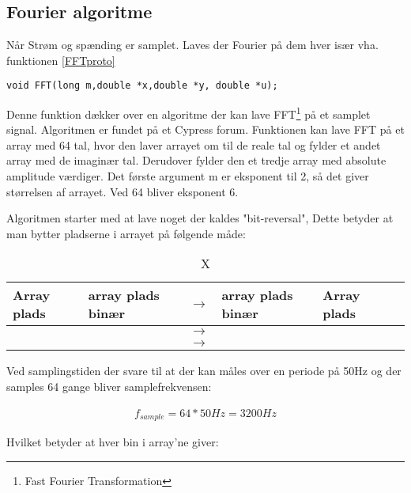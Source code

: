 
\subsection{Fourier algoritme}
Når Strøm og spænding er samplet. Laves der Fourier på dem hver især vha. funktionen \ref{FFTproto}

\begin{lstlisting}
void FFT(long m,double *x,double *y, double *u);
\end{lstlisting}

Denne funktion dækker over en algoritme der kan lave FFT\footnote{Fast Fourier Transformation} på et samplet signal. Algoritmen er fundet på et Cypress forum\cite{FFTalgo}. Funktionen kan lave FFT på et array med 64 tal, hvor den laver arrayet om til de reale tal og fylder et andet array med de imaginær tal. Derudover fylder den et tredje array med absolute amplitude værdiger. Det første argument m er eksponent til 2, så det giver størrelsen af arrayet. Ved 64 bliver eksponent 6.

Algoritmen starter med at lave noget der kaldes "bit-reversal", Dette betyder at man bytter pladserne i arrayet på følgende måde:

\begin{table}[H] 
	\centering 
	\begin{tabular}{|l|l|l|l|l|l|} %
		\hline 	%
		Array plads		& array plads binær & $\rightarrow$ 	& array plads binær    	& Array plads 	 \\ \hline 	%
		 	&   			& $\rightarrow$ & 				& 	 \\ \hline 
		 	&    			& $\rightarrow$ &					& 		 \\ \hline 
	\end{tabular} 
	\caption{X} 
	\label{tab:X} 
\end{table}
 


Ved samplingstiden der svare til at der kan måles over en periode på 50Hz og der samples 64 gange bliver samplefrekvensen:

\begin{align}
f_{sample} = 64 * 50Hz = 3200Hz
\end{align}   

Hvilket betyder at hver bin i array'ne giver:

